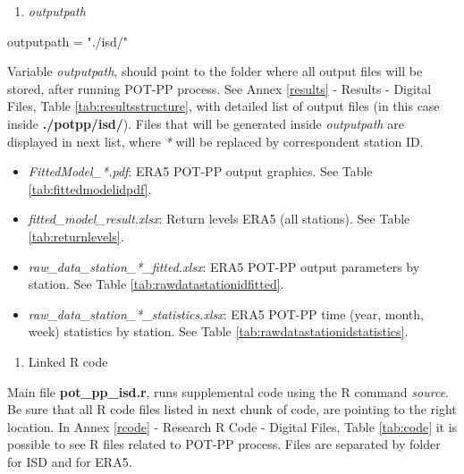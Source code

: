 \documentclass[12pt,oneside]{reedthesis}
\newenvironment{Shaded}{\begin{snugshade}}{\end{snugshade}}
\newcommand{\NormalTok}[1]{#1}
\newcommand{\StringTok}[1]{\textcolor[rgb]{0.31,0.60,0.02}{#1}}
\providecommand{\tightlist}{%
  \setlength{\itemsep}{0pt}\setlength{\parskip}{0pt}}
\begin{document}
\begin{enumerate}
\def\labelenumi{\arabic{enumi}.}
\setcounter{enumi}{2}
\tightlist
\item
  \emph{outputpath}
\end{enumerate}
\begin{Shaded}
\begin{Highlighting}[]
\NormalTok{outputpath =}\StringTok{ "./isd/"}
\end{Highlighting}
\end{Shaded}
Variable \emph{outputpath}, should point to the folder where all output files will be stored, after running POT-PP process. See Annex \ref{results} - Results - Digital Files, Table \ref{tab:resultsstructure}, with detailed list of output files (in this case inside \textbf{./potpp/isd/}). Files that will be generated inside \emph{outputpath} are displayed in next list, where \emph{*} will be replaced by correspondent station ID.
\begin{itemize}
\tightlist
\item
  \emph{FittedModel\_*.pdf}: ERA5 POT-PP output graphics. See Table \ref{tab:fittedmodelidpdf}.
\item
  \emph{fitted\_model\_result.xlsx}: Return levels ERA5 (all stations). See Table \ref{tab:returnlevels}.
\item
  \emph{raw\_data\_station\_*\_fitted.xlsx}: ERA5 POT-PP output parameters by station. See Table \ref{tab:rawdatastationidfitted}.
\item
  \emph{raw\_data\_station\_*\_statistics.xlsx}: ERA5 POT-PP time (year, month, week) statistics by station. See Table \ref{tab:rawdatastationidstatistics}.
\end{itemize}
\begin{enumerate}
\def\labelenumi{\arabic{enumi}.}
\setcounter{enumi}{3}
\tightlist
\item
  Linked R code
\end{enumerate}
Main file \textbf{pot\_pp\_isd.r}, runs supplemental code using the R command \emph{source}. Be sure that all R code files listed in next chunk of code, are pointing to the right location. In Annex \ref{rcode} - Research R Code - Digital Files, Table \ref{tab:code} it is possible to see R files related to POT-PP process. Files are separated by folder for ISD and for ERA5.
\end{document}
